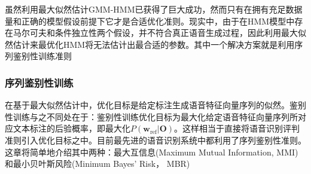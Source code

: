 虽然利用最大似然估计GMM-HMM已获得了巨大成功，然而只有在拥有充足数据量和正确的模型假设前提下它才是合适优化准则。现实中，由于在HMM模型中存在马尔可夫和条件独立性两个假设，并不符合真正语音生成过程，因此利用最大似然估计来最优化HMM将无法估计出最合适的参数。其中一个解决方案就是利用序列鉴别性训练准则~\cite{bahl1986maximum,schluter2001comparison,chou1993minimum,goel2000minimum,juang1997minimum,povey2005discriminative,povey2001improved}

\subsubsection{序列鉴别性训练}
在基于最大似然估计中，优化目标是给定标注生成语音特征向量序列的似然。鉴别性训练与之不同处在于：鉴别性训练优化目标为最大化给定语音特征向量序列所对应文本标注的后验概率，即最大化$P(\mathbf{w}_{\text{ref}}|\mathbf{O})$。这样相当于直接将语音识别评判准则引入优化目标之中。目前最先进的语音识别系统中都利用了序列鉴别性准则。这章将简单地介绍其中两种：最大互信息(Maximum Mutual Information, MMI)和最小贝叶斯风险(Minimum Bayes' Risk， MBR)
